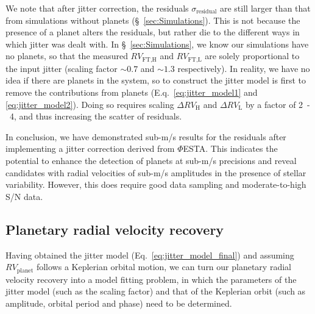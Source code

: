 We note that after jitter correction, the residuals $\sigma_\text{residual}$ are still larger than that from simulations without planets (\S~\ref{sec:Simulations}). This is not because the presence of a planet alters the residuals, but rather die to the different ways in which jitter was dealt with. In \S~\ref{sec:Simulations}, we know our simulations have no planets, so that the measured $RV_\text{FT,H}$ and $RV_\text{FT,L}$ are solely proportional to the input jitter (scaling factor $\sim 0.7$ and $\sim 1.3$ respectively). In reality, we have no idea if there are planets in the system, so to construct the jitter model is first to remove the contributions from planets (E.q.~\ref{eq:jitter_model1} and \ref{eq:jitter_model2}). Doing so requires scaling $\Delta RV_\text{H}$ and $\Delta RV_\text{L}$ by a factor of 2~-~4, and thus increasing the scatter of residuals. 

In conclusion, we have demonstrated sub-m/s results for the residuals after implementing a jitter correction derived from $\mathit{\Phi}$ESTA. This indicates the potential to enhance the detection of planets at sub-m/s precisions and reveal candidates with radial velocities of sub-m/s amplitudes in the presence of stellar variability. However, this does require good data sampling and moderate-to-high S/N data. 


\subsection{Planetary radial velocity recovery}

Having obtained the jitter model (Eq.~\ref{eq:jitter_model_final}) and assuming $RV_\text{planet}$ follows a Keplerian orbital motion, we can turn our planetary radial velocity recovery into a model fitting problem, in which the parameters of the jitter model (such as the scaling factor) and that of the Keplerian orbit (such as amplitude, orbital period and phase) need to be determined. 

